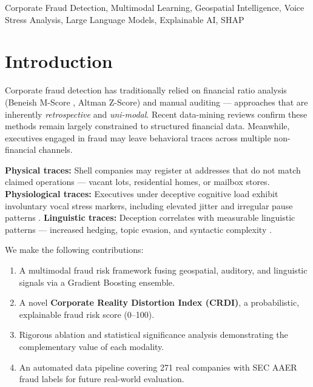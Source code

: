 \documentclass[conference]{IEEEtran}
\begin{document}
\begin{IEEEkeywords}
Corporate Fraud Detection, Multimodal Learning, Geospatial Intelligence,
Voice Stress Analysis, Large Language Models, Explainable AI, SHAP
\end{IEEEkeywords}

\section{Introduction}

Corporate fraud detection has traditionally relied on financial ratio analysis
(Beneish M-Score \cite{beneish1999}, Altman Z-Score) and manual auditing —
approaches that are inherently \emph{retrospective} and \emph{uni-modal}.
Recent data-mining reviews \cite{ngai2011} confirm these methods remain largely
constrained to structured financial data. Meanwhile, executives engaged in fraud
may leave behavioral traces across multiple non-financial channels.

\textbf{Physical traces:} Shell companies may register at addresses that do not
match claimed operations — vacant lots, residential homes, or mailbox stores.
\textbf{Physiological traces:} Executives under deceptive cognitive load exhibit
involuntary vocal stress markers, including elevated jitter and irregular pause
patterns \cite{kirchhubel2013}.
\textbf{Linguistic traces:} Deception correlates with measurable linguistic
patterns — increased hedging, topic evasion, and syntactic complexity
\cite{humpherys2011}.

We make the following contributions:
\begin{enumerate}
  \item A multimodal fraud risk framework fusing geospatial, auditory, and
        linguistic signals via a Gradient Boosting ensemble.
  \item A novel \textbf{Corporate Reality Distortion Index (CRDI)}, a
        probabilistic, explainable fraud risk score (0–100).
  \item Rigorous ablation and statistical significance analysis demonstrating
        the complementary value of each modality.
  \item An automated data pipeline covering 271 real companies with SEC AAER
        fraud labels for future real-world evaluation.
\end{enumerate}

\end{document}

